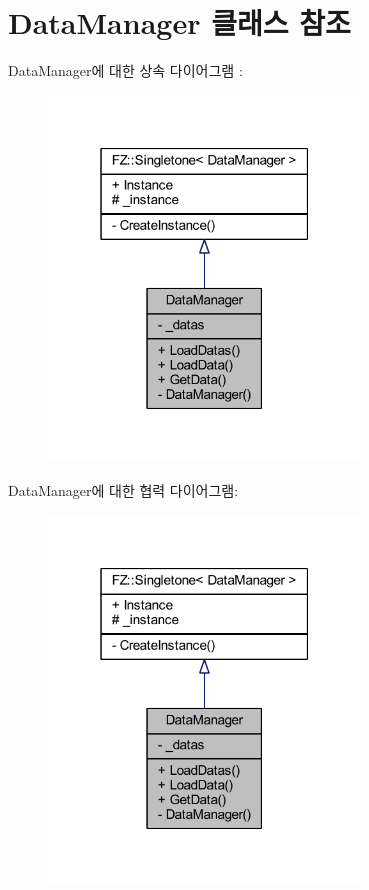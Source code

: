 \hypertarget{class_data_manager}{}\section{Data\+Manager 클래스 참조}
\label{class_data_manager}


Data\+Manager에 대한 상속 다이어그램 \+: 
\nopagebreak
\begin{figure}[H]
\begin{center}
\leavevmode
\includegraphics[width=235pt]{class_data_manager__inherit__graph}
\end{center}
\end{figure}


Data\+Manager에 대한 협력 다이어그램\+:
\nopagebreak
\begin{figure}[H]
\begin{center}
\leavevmode
\includegraphics[width=235pt]{class_data_manager__coll__graph}
\end{center}
\end{figure}
